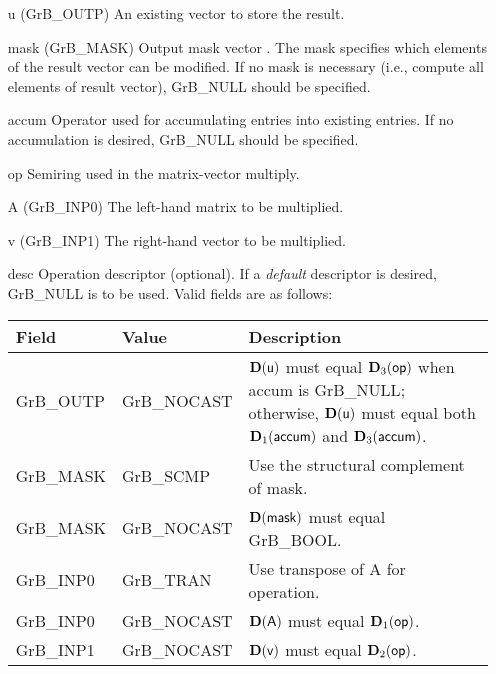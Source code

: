 \begin{itemize}[leftmargin=1.1in]
    \item[{\sf u}]    ({\sf GrB\_OUTP}) An existing vector to store the result.
    
    \item[{\sf mask}] ({\sf GrB\_MASK}) Output mask vector . The mask
    specifies which elements of the result vector can be modified.
    If no mask is necessary (i.e., compute all elements of result
    vector), {\sf GrB\_NULL} should be specified.

	\item[{\sf accum}]  Operator used for accumulating entries into existing
                         entries. If no accumulation is desired,
	                    {\sf GrB\_NULL} should be specified.

    \item[{\sf op}]   Semiring used in the matrix-vector multiply.
    \item[{\sf A}]    ({\sf GrB\_INP0}) The left-hand matrix to be multiplied.
    \item[{\sf v}]    ({\sf GrB\_INP1}) The right-hand vector to be multiplied.

    \item[{\sf desc}]  Operation descriptor (optional). If a
    \emph{default} descriptor is desired, {\sf GrB\_NULL} is to be
    used. Valid fields are as follows: \\
    \begin{tabular}{llp{3in}}
    Field  & Value & Description \\
    \hline
    {\sf GrB\_OUTP} & {\sf GrB\_NOCAST} & $\bold{D}({\sf u})$ must equal $\bold{D}_3({\sf op})$
                                          when {\sf accum} is {\sf GrB\_NULL}; otherwise, $\bold{D}({\sf u})$
                                          must equal both $\bold{D}_1({\sf accum})$ and $\bold{D}_3({\sf accum})$.\\
    {\sf GrB\_MASK} & {\sf GrB\_SCMP}   & Use the structural complement of {\sf mask}. \\
    {\sf GrB\_MASK} & {\sf GrB\_NOCAST} & $\bold{D}({\sf mask})$ must equal {\sf GrB\_BOOL}. \\
    {\sf GrB\_INP0} & {\sf GrB\_TRAN}   & Use transpose of {\sf A} for operation. \\
    {\sf GrB\_INP0} & {\sf GrB\_NOCAST} & $\bold{D}({\sf A})$ must equal $\bold{D}_1({\sf op})$. \\
    {\sf GrB\_INP1} & {\sf GrB\_NOCAST} & $\bold{D}({\sf v})$ must equal $\bold{D}_2({\sf op})$. \\
    \end{tabular}
\end{itemize}

